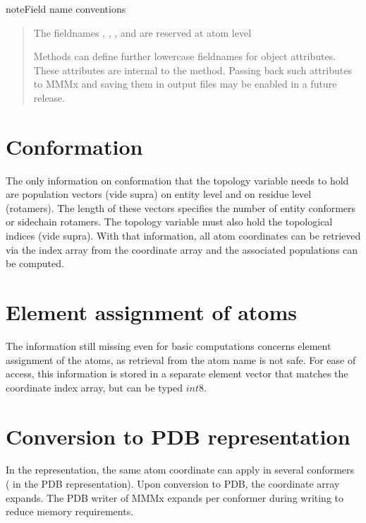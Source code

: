 \documentclass[letterpaper,10pt,english]{sphinxmanual}
\begin{document}
\begin{sphinxadmonition}{note}{Field name conventions}
\begin{quote}
The fieldnames , , , and  are reserved at atom level

Methods can define further lower\sphinxhyphen{}case fieldnames for object attributes. These attributes are internal to the method.
Passing back such attributes to MMMx and saving them in  output files may be enabled in a future release.
\end{quote}
\end{sphinxadmonition}


\section{Conformation}
\label{\detokenize{MMMx_atomic:conformation}}
The only information on conformation that the topology variable needs to hold are population vectors (vide supra) on entity level and on residue level (rotamers).
The length of these vectors specifies the number of entity conformers or sidechain rotamers. The topology variable must also hold the topological indices (vide supra).
With that information, all atom coordinates can be retrieved via the index array from the coordinate array and the associated populations can be computed.


\section{Element assignment of atoms}
\label{\detokenize{MMMx_atomic:element-assignment-of-atoms}}
The information still missing even for basic computations concerns element assignment of the atoms, as retrieval from the atom name is not safe.
For ease of access, this information is stored in a separate element vector that matches the coordinate index array, but can be typed \(int8\).


\section{Conversion to PDB representation}
\label{\detokenize{MMMx_atomic:conversion-to-pdb-representation}}
In the  representation, the same atom coordinate can apply in several conformers ( in the PDB representation).
Upon conversion to PDB, the coordinate array expands. The PDB writer of MMMx expands per conformer during writing to reduce memory requirements.
\end{document}
